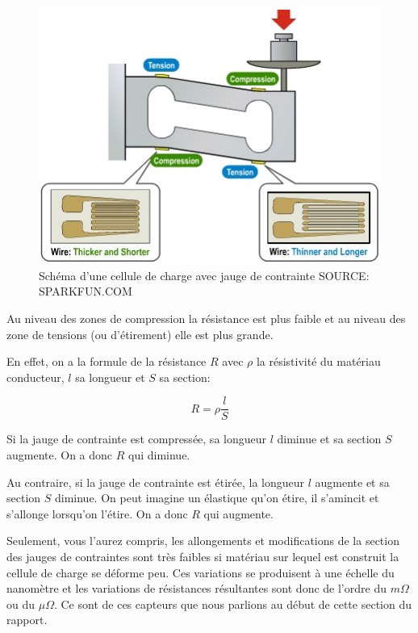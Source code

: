 \documentclass{polytech/polytech}
\begin{document}
\begin{figure}
\begin{center}
\includegraphics[scale=1]{image/load_cell.jpg}
\end{center}
\caption{Schéma d'une cellule de charge avec jauge de contrainte SOURCE: SPARKFUN.COM}
\label{fig:load_cell_sparkfun}
\end{figure}

Au niveau des zones de compression la résistance est plus faible et au niveau des zone de tensions (ou d'étirement) elle est plus grande.

En effet, on a la formule de la résistance $R$ avec $\rho$ la résistivité du matériau conducteur, $l$ sa longueur et $S$ sa section: 

\begin{equation}
R= \rho \frac{l}{S}
\end{equation}

Si la jauge de contrainte est compressée, sa longueur $l$ diminue et sa section $S$ augmente. On a donc $R$ qui diminue.

Au contraire, si la jauge de contrainte est étirée, la longueur $l$ augmente et sa section $S$ diminue. On peut imagine un élastique qu'on étire, il s'amincit et s'allonge lorsqu'on l'étire.  On a donc $R$ qui augmente.

Seulement, vous l'aurez compris, les allongements et modifications de la section des jauges de contraintes sont très faibles si matériau sur lequel est construit la cellule de charge se déforme peu. Ces variations se produisent à une échelle du nanomètre et les variations de résistances résultantes sont donc de l'ordre du $m\Omega$ ou du $\mu\Omega$. Ce sont de ces capteurs que nous parlions au début de cette section du rapport.
\end{document}
